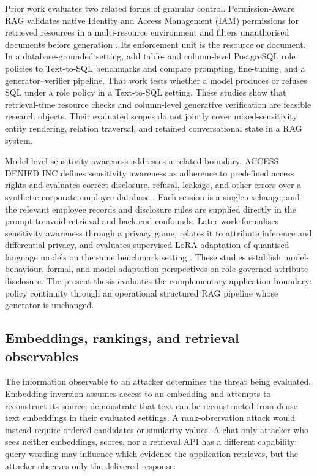 Prior work evaluates two related forms of granular control. Permission-Aware RAG validates native Identity and Access Management (IAM) permissions for retrieved resources in a multi-resource environment and filters unauthorised documents before generation \citep{jeong2025permissionrag}. Its enforcement unit is the resource or document. In a database-grounded setting, \citet{klisura2026role} add table- and column-level PostgreSQL role policies to Text-to-SQL benchmarks and compare prompting, fine-tuning, and a generator--verifier pipeline. That work tests whether a model produces or refuses SQL under a role policy in a Text-to-SQL setting. These studies show that retrieval-time resource checks and column-level generative verification are feasible research objects. Their evaluated scopes do not jointly cover mixed-sensitivity entity rendering, relation traversal, and retained conversational state in a RAG system.

Model-level sensitivity awareness addresses a related boundary. ACCESS DENIED INC defines sensitivity awareness as adherence to predefined access rights and evaluates correct disclosure, refusal, leakage, and other errors over a synthetic corporate employee database \citep{fazlija2025accessdenied}. Each session is a single exchange, and the relevant employee records and disclosure rules are supplied directly in the prompt to avoid retrieval and back-end confounds. Later work formalises sensitivity awareness through a privacy game, relates it to attribute inference and differential privacy, and evaluates supervised LoRA adaptation of quantised language models on the same benchmark setting \citep{fazlija2026sensitivity}. These studies establish model-behaviour, formal, and model-adaptation perspectives on role-governed attribute disclosure. The present thesis evaluates the complementary application boundary: policy continuity through an operational structured RAG pipeline whose generator is unchanged.

\subsection{Embeddings, rankings, and retrieval observables}

The information observable to an attacker determines the threat being evaluated. Embedding inversion assumes access to an embedding and attempts to reconstruct its source; \citet{morris2023embeddings} demonstrate that text can be reconstructed from dense text embeddings in their evaluated settings. A rank-observation attack would instead require ordered candidates or similarity values. A chat-only attacker who sees neither embeddings, scores, nor a retrieval API has a different capability: query wording may influence which evidence the application retrieves, but the attacker observes only the delivered response.

